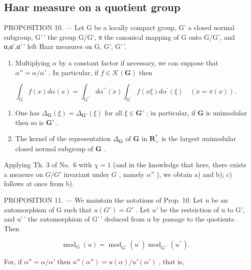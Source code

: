 \subsection{Haar measure on a quotient group}

PROPOSITION 10. --- Let G be a locally compact group, G' a closed normal subgroup, G'\,' the group G/G', π the canonical mapping of G onto G/G', and α,α',α'\,' left Haar measures on G, G', G'\,'.

\begin{enumerate}
\def\labelenumi{\alph{enumi})}
\tightlist
\item
  Multiplying \(\alpha\) by a constant factor if necessary, we can suppose that \(\alpha'' = \alpha / \alpha'\) . In particular, if \(f \in \mathcal{K}(\mathbf{G})\) then
\end{enumerate}

\[
\int_ {\mathrm{G}} f (x) d \alpha (x) = \int_ {\mathrm{G} ^ {\prime \prime}} d \alpha^ {\prime \prime} (\dot {x}) \int_ {\mathrm{G} ^ {\prime}} f (x \xi) d \alpha^ {\prime} (\xi) \quad (\dot {x} = \pi (x)).
\]

\begin{enumerate}
\def\labelenumi{\alph{enumi})}
\setcounter{enumi}{1}
\item
  One has \(\Delta_{\mathbf{G}}(\xi) = \Delta_{\mathbf{G}'}(\xi)\) for all \(\xi \in \mathbf{G}'\) ; in particular, if \(\mathbf{G}\) is unimodular then so is \(\mathbf{G}'\) .
\item
  The kernel of the representation \(\Delta_{\mathbf{G}}\) of \(\mathbf{G}\) in \(\mathbf{R}_{+}^{*}\) is the largest unimodular closed normal subgroup of \(\mathbf{G}\) .
\end{enumerate}

Applying Th. 3 of No.~6 with \(\chi = 1\) (and in the knowledge that here, there exists a measure on \(G / G'\) invariant under \(G\) , namely \(\alpha''\) ), we obtain a) and b); c) follows at once from b).

PROPOSITION 11. --- We maintain the notations of Prop. 10. Let u be an automorphism of G such that \(u(G') = G'\) . Let \(u'\) be the restriction of u to G', and u'\,' the automorphism of G'\,' deduced from u by passage to the quotients. Then

\[
\operatorname{mod} _ {\mathrm{G}} (u) = \operatorname{mod} _ {\mathrm{G} ^ {\prime}} \left(u ^ {\prime}\right) \operatorname{mod} _ {\mathrm{G} ^ {\prime \prime}} \left(u ^ {\prime \prime}\right).
\]

For, if \(\alpha'' = \alpha / \alpha'\) then \(u''(\alpha'') = u(\alpha) / u'(\alpha')\) , that is,

